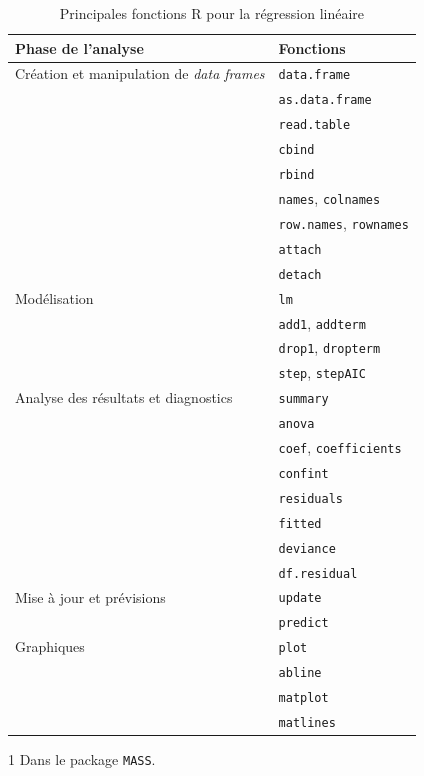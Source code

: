 \documentclass[letterpaper,10pt]{memoir}\usepackage[]{graphicx}\usepackage[]{color}
\makeatletter
\newcommand{\code}[1]{\texttt{#1}}
\newcommand{\indexfonction}[1]{\index{#1@\code{#1}}}
\newcommand{\fonction}[1]{\code{#1}\indexfonction{#1}}
\makeatother
\begin{document}
\begin{table}[t]
  \centering
  \begin{threeparttable}
    \begin{tabular}{ll}
      \toprule
      \textbf{Phase de l'analyse} & \textbf{Fonctions} \\
      \midrule
      Création et manipulation de \emph{data frames}
        & \fonction{data.frame} \\
        & \fonction{as.data.frame} \\
        & \fonction{read.table} \\
        & \fonction{cbind} \\
        & \fonction{rbind} \\
        & \fonction{names}, \fonction{colnames} \\
        & \fonction{row.names}, \fonction{rownames} \\
        & \fonction{attach} \\
        & \fonction{detach} \\
      \midrule
      Modélisation
        & \fonction{lm} \\
        & \fonction{add1}, \fonction{addterm}\tnote{1} \\
        & \fonction{drop1}, \fonction{dropterm}\tnote{1} \\
        & \fonction{step}, \fonction{stepAIC}\tnote{1} \\
      \midrule
      Analyse des résultats et diagnostics
        & \fonction{summary} \\
        & \fonction{anova} \\
        & \fonction{coef}, \fonction{coefficients} \\
        & \fonction{confint} \\
        & \fonction{residuals} \\
        & \fonction{fitted} \\
        & \fonction{deviance} \\
        & \fonction{df.residual} \\
      \midrule
      Mise à jour et prévisions
        & \fonction{update} \\
        & \fonction{predict} \\
      \midrule
      Graphiques
        & \fonction{plot} \\
        & \fonction{abline} \\
        & \fonction{matplot} \\
        & \fonction{matlines} \\
      \bottomrule
    \end{tabular}
    \begin{tablenotes}
    \item[1] Dans le package \texttt{MASS}.
    \end{tablenotes}
  \end{threeparttable}
  \caption{Principales fonctions \textsf{R} pour la
    régression linéaire}
  \label{tab:regression:fonctions}
\end{table}
\end{document}
